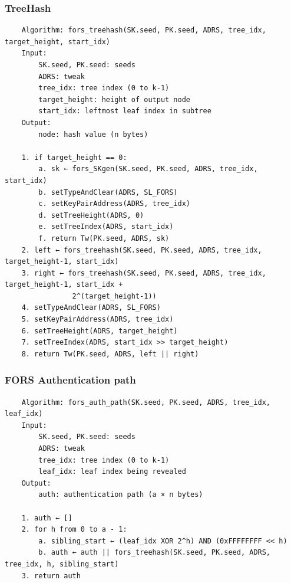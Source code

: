 \subsubsection{TreeHash}
\begin{verbatim}
    Algorithm: fors_treehash(SK.seed, PK.seed, ADRS, tree_idx, target_height, start_idx)
    Input:
        SK.seed, PK.seed: seeds
        ADRS: tweak
        tree_idx: tree index (0 to k-1)
        target_height: height of output node
        start_idx: leftmost leaf index in subtree
    Output:
        node: hash value (n bytes)

    1. if target_height == 0:
        a. sk ← fors_SKgen(SK.seed, PK.seed, ADRS, tree_idx, start_idx)
        b. setTypeAndClear(ADRS, SL_FORS)
        c. setKeyPairAddress(ADRS, tree_idx)
        d. setTreeHeight(ADRS, 0)
        e. setTreeIndex(ADRS, start_idx)
        f. return Tw(PK.seed, ADRS, sk)
    2. left ← fors_treehash(SK.seed, PK.seed, ADRS, tree_idx, target_height-1, start_idx)
    3. right ← fors_treehash(SK.seed, PK.seed, ADRS, tree_idx, target_height-1, start_idx + 
                2^(target_height-1))
    4. setTypeAndClear(ADRS, SL_FORS)
    5. setKeyPairAddress(ADRS, tree_idx)
    6. setTreeHeight(ADRS, target_height)
    7. setTreeIndex(ADRS, start_idx >> target_height)
    8. return Tw(PK.seed, ADRS, left || right)
\end{verbatim}

\subsubsection{FORS Authentication path}
\begin{verbatim}
    Algorithm: fors_auth_path(SK.seed, PK.seed, ADRS, tree_idx, leaf_idx)
    Input:
        SK.seed, PK.seed: seeds
        ADRS: tweak
        tree_idx: tree index (0 to k-1)
        leaf_idx: leaf index being revealed
    Output:
        auth: authentication path (a × n bytes)

    1. auth ← []
    2. for h from 0 to a - 1:
        a. sibling_start ← (leaf_idx XOR 2^h) AND (0xFFFFFFFF << h)
        b. auth ← auth || fors_treehash(SK.seed, PK.seed, ADRS, tree_idx, h, sibling_start)
    3. return auth
\end{verbatim}

